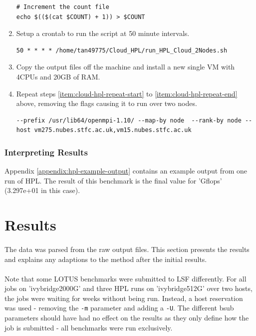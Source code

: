 \documentclass{article}
\newenvironment{code}{\captionsetup{type=listing}}{}
\begin{document}
\begin{enumerate}
\begin{code}
\begin{verbatim}
# Increment the count file
echo $(($(cat $COUNT) + 1)) > $COUNT
                    \end{verbatim}
                    \end{code}

                \item \label{item:cloud-hpl-repeat-end} Setup a crontab to run the script at 50 minute intervals.

                    \begin{verbatim}
50 * * * * /home/tan49775/Cloud_HPL/run_HPL_Cloud_2Nodes.sh
                    \end{verbatim}
                \item Copy the output files off the machine and install a new single VM with 4CPUs and 20GB of RAM.

                \item \label{item:cloud-hpl-one-vm} Repeat steps \ref{item:cloud-hpl-repeat-start} to \ref{item:cloud-hpl-repeat-end} above, removing the flags causing it to run over two nodes.

                \begin{verbatim}
--prefix /usr/lib64/openmpi-1.10/ --map-by node  --rank-by node --host vm275.nubes.stfc.ac.uk,vm15.nubes.stfc.ac.uk
                \end{verbatim}

            \end{enumerate}


        \subsubsection{Interpreting Results}
            Appendix \ref{appendix:hpl-example-output} contains an example output from one run of HPL. The result of this benchmark is the final value for 'Gflops' (3.297e+01 in this case).


\section{Results}
    \paragraph{} The data was parsed from the raw output files. This section presents the results and explains any adaptions to the method after the initial results.

    \paragraph{}
    Note that some LOTUS benchmarks were submitted to LSF differently. For all jobs on 'ivybridge2000G' and three HPL runs on 'ivybridge512G' over two hosts, the jobs were waiting for weeks without being run. Instead, a host reservation was used - removing the \texttt{-m} parameter and adding a \texttt{-U}. The different bsub parameters should have had no effect on the results as they only define how the job is submitted - all benchmarks were run exclusively.
\end{document}
